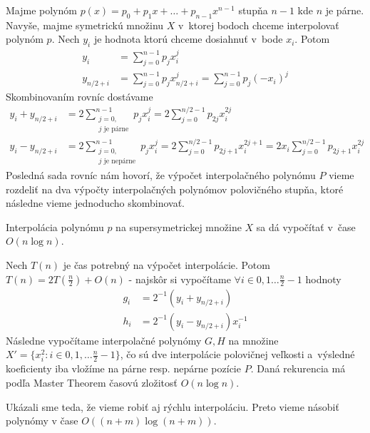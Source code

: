 Majme polynóm $p(x)=p_0 + p_1 x + \dots + p_{n-1} x^{n-1}$ stupňa
$n-1$ kde $n$ je párne. Navyše, majme symetrickú množinu $X$ v~ktorej
bodoch chceme interpolovať polynóm $p$. 
Nech $y_i$ je hodnota ktorú chceme dosiahnuť v~bode $x_i$. Potom
\begin{align*}
    y_i &= \sum_{j=0}^{n-1} p_j x_i^j \\
    y_{n/2+i} &= \sum_{j=0}^{n-1} p_j x_{n/2+i}^j 
            = \sum_{j=0}^{n-1} p_j (-x_i)^j 
\end{align*}
Skombinovaním rovníc dostávame
\begin{align*}
    y_i + y_{n/2 + i} &= 2 \sum_{\substack{j=0,\\
        j\text{ je párne}}}^{n-1} p_j x_i^j
    = 2 \sum_{j=0}^{n/2-1} p_{2j} x_i^{2j} \\
    y_i - y_{n/2 + i} &= 2 \sum_{\substack{j=0,\\ 
        j\text{ je nepárne}}}^{n-1} p_j x_i^j
     = 2 \sum_{j=0}^{n/2-1} p_{2j+1} x_i^{2j+1} =
      2 x_i \sum_{j=0}^{n/2-1} p_{2j+1} x_i^{2j}
\end{align*}
Posledná sada rovníc nám hovorí, že výpočet interpolačného polynómu
$P$ vieme rozdeliť na dva výpočty interpolačných polynómov polovičného
stupňa, ktoré následne vieme jednoducho skombinovať.
\begin{lema}
    Interpolácia polynómu $p$ na supersymetrickej množine $X$ sa dá
    vypočítať v~čase $O(n \log n)$.
\end{lema}
\begin{dokaz}
    Nech $T(n)$ je čas potrebný na výpočet interpolácie.
    Potom $T(n)=2 T(\frac{n}{2}) + O(n)$ - najskôr si vypočítame
    $\forall i \in 0,1\dots \frac{n}{2}-1$ hodnoty 
    \begin{align}
        \label{eq:interpolacia_g}
        g_i &= 2^{-1}(y_i + y_{n/2+i}) \\
        \label{eq:interpolacia_h}
        h_i &= 2^{-1}(y_i - y_{n/2+i}) x_i^{-1}
    \end{align}
    Následne
    vypočítame interpolačné polynómy $G,H$ na množine
    $X'=\{x_i^2 : i \in 0,1,\dots \frac{n}{2}-1\}$, čo sú dve interpolácie
    polovičnej veľkosti a~výsledné koeficienty iba vložíme na párne
    resp. nepárne pozície $P$.
    Daná rekurencia má podľa Master Theorem časovú zložitosť $O(n \log
    n)$.
\end{dokaz}

Ukázali sme teda, že vieme robiť aj rýchlu interpoláciu. Preto vieme
násobiť polynómy v čase $O((n+m) \log (n+m))$.

